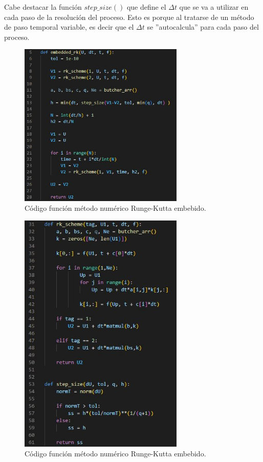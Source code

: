 \documentclass[12pt,a4paper]{article}
\begin{document}
Cabe destacar la función $step\_size()$ que define el $\Delta t$ que se va a utilizar en cada paso de la resolución del proceso. Esto es porque al tratarse de un método de paso temporal variable, es decir que el $\Delta t$ se ''autocalcula'' para cada paso del proceso.
\begin{figure}[H]
	\centering
	\includegraphics[width=0.7\textwidth]{FIGURES/mil6/codigo/erk1.JPG}
	\caption{Código función método numérico Runge-Kutta embebido.}
	\label{erk1}
\end{figure}
\begin{figure}[H]
	\centering
	\includegraphics[width=0.7\textwidth]{FIGURES/mil6/codigo/erk2.JPG}
	\caption{Código función método numérico Runge-Kutta embebido.}
	\label{erk2}
\end{figure}
\end{document}

